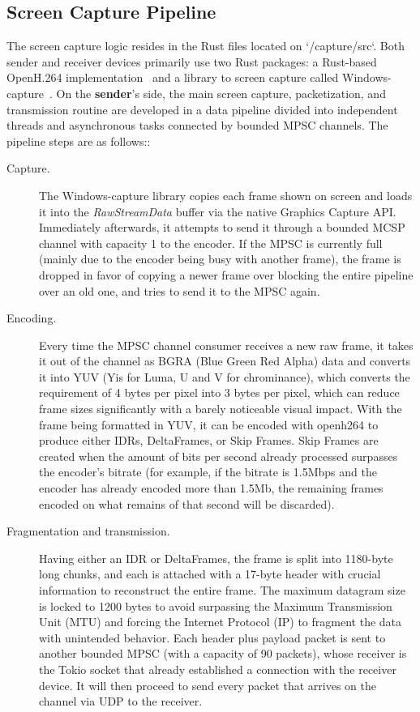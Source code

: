 \documentclass{article}
\begin{document}
\subsection{Screen Capture Pipeline}
\label{sec:screencap}
The screen capture logic resides in the Rust files located on \colorbox{gray!20}{`/capture/src`}. Both sender and receiver devices primarily use two Rust packages: a Rust-based OpenH.264 implementation~\cite{openh264_rs} and a library to screen capture called Windows-capture~\cite{windows_capture}. On the \textbf{sender}'s side, the main screen capture, packetization, and transmission routine are developed in a data pipeline divided into independent threads and asynchronous tasks connected by bounded MPSC channels. The pipeline steps are as follows::
\begin{description}
     \item[Capture.]The Windows-capture library copies each frame shown on screen and loads it into the \textit{RawStreamData} buffer via the native Graphics Capture API. Immediately afterwards, it attempts to send it through a bounded MCSP channel with capacity 1 to the encoder. If the MPSC is currently full (mainly due to the encoder being busy with another frame), the frame is dropped
    in favor of copying a newer frame over blocking the entire pipeline over an old one, and tries to send it to the MPSC again.  
    \item[Encoding.]  Every time the MPSC channel consumer receives a new raw frame, it takes it out of the channel as BGRA (Blue Green Red Alpha) data and converts it into YUV (Yis for Luma, U and V for chrominance), which converts the requirement of 4 bytes per pixel into 3 bytes per pixel, which can reduce frame sizes significantly with a barely noticeable visual impact. With the frame being formatted 
    in YUV, it can be encoded with openh264 to produce either IDRs, DeltaFrames, or Skip Frames. Skip Frames are created when the amount of bits per second already processed surpasses the encoder's bitrate (for example, if the bitrate is 1.5Mbps and the encoder has already encoded more than 1.5Mb, the remaining frames encoded on what remains of that second will be discarded).
    \item[Fragmentation and transmission.] Having either an IDR or DeltaFrames, the frame is split into 1180-byte long chunks, and each is attached with a 17-byte header with crucial information to reconstruct the entire frame. The maximum datagram size is locked to 1200 bytes to avoid surpassing the Maximum Transmission Unit (MTU) and forcing the Internet Protocol (IP) to fragment the data with unintended behavior. Each header plus payload packet is 
    sent to another bounded MPSC (with a capacity of 90 packets), whose receiver is the Tokio socket that already established a connection with the receiver device. It will then proceed to send every packet that arrives on the channel via UDP to the receiver.   
  \end{description}
\end{document}
